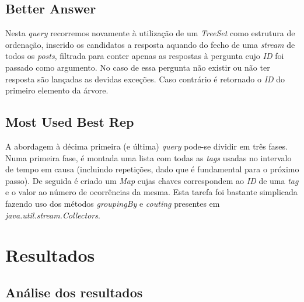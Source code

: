 \documentclass[a4paper, 11pt, oneside]{article}
\begin{document}
\subsection{Better Answer}

Nesta \textit{query} recorremos novamente à utilização de um \textit{TreeSet} como estrutura de ordenação, inserido os candidatos a resposta aquando do fecho de uma \textit{stream} de todos os \textit{posts}, filtrada para conter apenas as respostas à pergunta cujo \textit{ID} foi passado como argumento. No caso de essa pergunta não existir ou não ter resposta são lançadas as devidas exceções. Caso contrário é retornado o \textit{ID} do primeiro elemento da árvore.



\subsection{Most Used Best Rep}

A abordagem à décima primeira (e última) \textit{query} pode-se dividir em três fases. Numa primeira fase, é montada uma lista com todas as \textit{tags} usadas no intervalo de tempo em causa (incluindo repetições, dado que é fundamental para o próximo passo). De seguida é criado um \textit{Map} cujas chaves correspondem ao \textit{ID} de uma \textit{tag} e o valor ao número de ocorrências da mesma. Esta tarefa foi bastante simplicada fazendo uso dos métodos \textit{groupingBy} e \textit{couting} presentes em  \textit{java.util.stream.Collectors}. 






\section{Resultados}

\subsection{Análise dos resultados}
\end{document}
